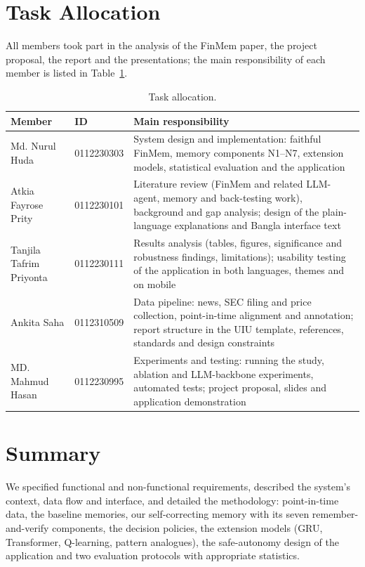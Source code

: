 \section{Task Allocation}
All members took part in the analysis of the FinMem paper, the project proposal, the report and the presentations; the main responsibility of each member is listed in Table~\ref{tab:tasks}.
\begin{table}[H]
\centering
\caption{Task allocation.}
\label{tab:tasks}
\small
\begin{tabular}{p{}p{}p{}}
\hline
Member & ID & Main responsibility \\
\hline
Md. Nurul Huda & 0112230303 & System design and implementation: faithful FinMem, memory components N1--N7, extension models, statistical evaluation and the application \\
Atkia Fayrose Prity & 0112230101 & Literature review (FinMem and related LLM-agent, memory and back-testing work), background and gap analysis; design of the plain-language explanations and Bangla interface text \\
Tanjila Tafrim Priyonta & 0112230111 & Results analysis (tables, figures, significance and robustness findings, limitations); usability testing of the application in both languages, themes and on mobile \\
Ankita Saha & 0112310509 & Data pipeline: news, SEC filing and price collection, point-in-time alignment and annotation; report structure in the UIU template, references, standards and design constraints \\
MD. Mahmud Hasan & 0112230995 & Experiments and testing: running the study, ablation and LLM-backbone experiments, automated tests; project proposal, slides and application demonstration \\
\hline
\end{tabular}
\end{table}

\section{Summary}
We specified functional and non-functional requirements, described the system's context, data flow and interface, and detailed the methodology: point-in-time data, the baseline memories, our self-correcting memory with its seven remember-and-verify components, the decision policies, the extension models (GRU, Transformer, Q-learning, pattern analogues), the safe-autonomy design of the application and two evaluation protocols with appropriate statistics.
